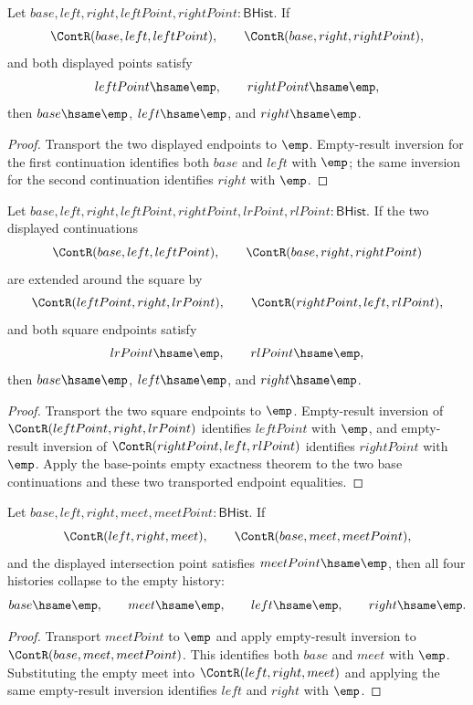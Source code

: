 \begin{theorem}
\label{thm:filter-principal-suffix-base-points-empty-exact}
Let $base,left,right,leftPoint,rightPoint:\mathsf{BHist}$. If
$$
\ContR(base,left,leftPoint),\qquad
\ContR(base,right,rightPoint),
$$
and both displayed points satisfy
$$
leftPoint\hsame\emp,\qquad rightPoint\hsame\emp,
$$
then $base\hsame\emp$, $left\hsame\emp$, and $right\hsame\emp$.
\end{theorem}
\begin{proof}
Transport the two displayed endpoints to $\emp$. Empty-result inversion for the
first continuation identifies both $base$ and $left$ with $\emp$; the same
inversion for the second continuation identifies $right$ with $\emp$.
\end{proof}

\begin{theorem}
\label{thm:filter-principal-suffix-unary-commuting-square-empty-exact}
Let $base,left,right,leftPoint,rightPoint,lrPoint,rlPoint:\mathsf{BHist}$.
If the two displayed continuations
$$
\ContR(base,left,leftPoint),\qquad
\ContR(base,right,rightPoint)
$$
are extended around the square by
$$
\ContR(leftPoint,right,lrPoint),\qquad
\ContR(rightPoint,left,rlPoint),
$$
and both square endpoints satisfy
$$
lrPoint\hsame\emp,\qquad rlPoint\hsame\emp,
$$
then $base\hsame\emp$, $left\hsame\emp$, and $right\hsame\emp$.
\end{theorem}
\begin{proof}
Transport the two square endpoints to $\emp$. Empty-result inversion of
$\ContR(leftPoint,right,lrPoint)$ identifies $leftPoint$ with $\emp$, and
empty-result inversion of $\ContR(rightPoint,left,rlPoint)$ identifies
$rightPoint$ with $\emp$. Apply the base-points empty exactness theorem to the
two base continuations and these two transported endpoint equalities.
\end{proof}

\begin{theorem}
\label{thm:filter-principal-suffix-intersection-empty-point-exact}
Let $base,left,right,meet,meetPoint:\mathsf{BHist}$. If
$$
\ContR(left,right,meet),\qquad
\ContR(base,meet,meetPoint),
$$
and the displayed intersection point satisfies $meetPoint\hsame\emp$, then
all four histories collapse to the empty history:
$$
base\hsame\emp,\qquad meet\hsame\emp,\qquad
left\hsame\emp,\qquad right\hsame\emp.
$$
\end{theorem}
\begin{proof}
Transport $meetPoint$ to $\emp$ and apply empty-result inversion to
$\ContR(base,meet,meetPoint)$. This identifies both $base$ and $meet$ with
$\emp$. Substituting the empty meet into $\ContR(left,right,meet)$ and
applying the same empty-result inversion identifies $left$ and $right$ with
$\emp$.
\end{proof}

